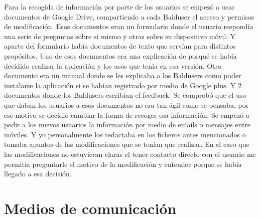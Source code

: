 Para la recogida de información por parte de los usuarios se empezó a usar documentos de Google Drive, compartiendo a cada Balduser el acceso y permisos de modificación.
Esos documentos eran un formulario donde el usuario respondía una serie de preguntas sobre sí mismo y otras sobre su dispositivo móvil. Y aparte del formulario había documentos de texto que servían para distintos propósitos.
Uno de esos documentos era una explicación de porqué se había decidido realizar la aplicación y los usos que tenía en esa versión.
Otro documento era un manual donde se les explicaba a los Baldusers como poder instalarse la aplicación si se habían registrado por medio de Google plus.
Y 2 documentos donde los Baldusers escribían el feedback.
Se comprobó que el uso que daban los usuarios a esos documentos no era tan ágil como se pensaba, por ese motivo se decidió cambiar la forma de recoger esa información.
Se empezó a pedir a los nuevos usuarios la información por medio de emails o mensajes entre móviles. Y yo personalmente los redactaba en los ficheros antes mencionados o tomaba apuntes de las modificaciones que se tenían que realizar.
En el caso que las modificaciones no estuvieran claras el tener contacto directo con el usuario me permitía preguntarle el motivo de la modificación y entender porque se había llegado a esa decisión.


\section{Medios de comunicación}
\label{secc:medios de comunicación}

